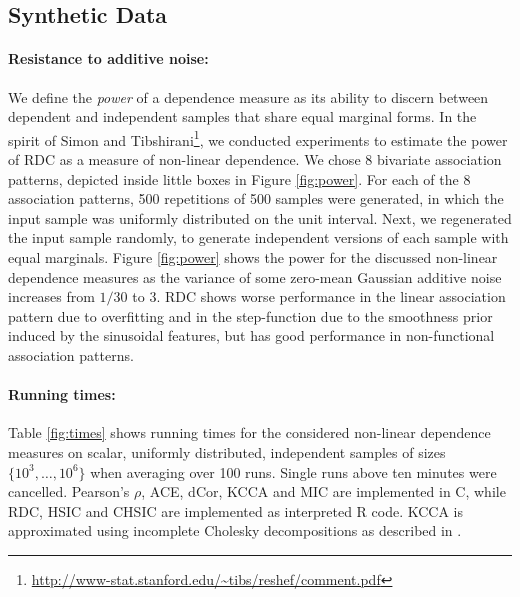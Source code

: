 \documentclass{article}
\begin{document}
\subsection{Synthetic Data}

\paragraph{Resistance to additive noise:}
We define the \emph{power} of a dependence measure as its ability to discern
between dependent and independent samples that share equal marginal forms. In
the spirit of Simon and
Tibshirani\footnote{\url{http://www-stat.stanford.edu/~tibs/reshef/comment.pdf}},
we conducted experiments to estimate the power of RDC as a measure of
non-linear dependence.  We chose 8 bivariate association patterns, depicted
inside little boxes in Figure \ref{fig:power}. For each of the 8 association
patterns, 500 repetitions of 500 samples were generated, in which the input
sample was uniformly distributed on the unit interval. Next, we regenerated
the input sample randomly, to generate independent versions of each sample
with equal marginals. Figure \ref{fig:power} shows the power for the discussed
non-linear dependence measures as the variance of some zero-mean Gaussian
additive noise increases from $1/30$ to $3$.  RDC shows worse performance in
the linear association pattern due to overfitting and in the
step-function due to the smoothness prior induced by the sinusoidal
features, but has good performance in non-functional association
patterns.

\paragraph{Running times:}
Table \ref{fig:times} shows running times for the considered non-linear
dependence measures on scalar, uniformly distributed, independent samples of
sizes $\{10^3, \ldots, 10^6\}$ when averaging over 100 runs. Single runs above
ten minutes were cancelled. Pearson's $\rho$, ACE, dCor, KCCA and MIC are
implemented in C, while RDC, HSIC and CHSIC are implemented as interpreted R
code. KCCA is approximated using incomplete Cholesky decompositions as described
in \cite{Bach02}.
\end{document}

